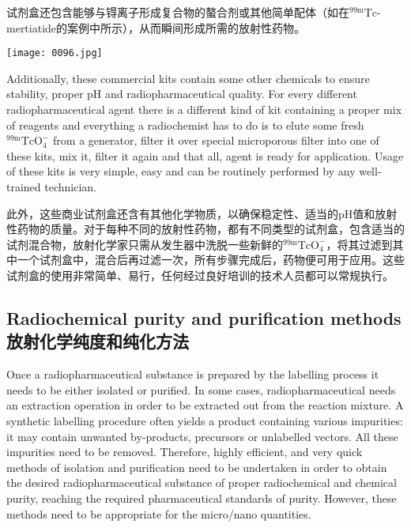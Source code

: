 \documentclass[dvipsnames, svgnames,a4paper,11pt]{article}
\begin{document}
试剂盒还包含能够与锝离子形成复合物的螯合剂或其他简单配体（如在${}^\mathrm{99m}\mathrm{Tc}$-mertiatide的案例中所示），从而瞬间形成所需的放射性药物。

\begin{figure*}[h]
    \centering
    \texttt{[image: 0096.jpg]}
\end{figure*}

Additionally, these commercial kits contain some other chemicals to ensure stability,
proper pH and radiopharmaceutical quality. For every different radiopharmaceutical
agent there is a different kind of kit containing a proper mix of reagents and
everything a radiochemist has to do is to elute some fresh ${}^\mathrm{99m}\mathrm{TcO_4^-}$ from a generator,
filter it over special microporous filter into one of these kits, mix it, filter it again and
that all, agent is ready for application. Usage of these kits is very simple, easy and
can be routinely performed by any well-trained technician.

此外，这些商业试剂盒还含有其他化学物质，以确保稳定性、适当的pH值和放射性药物的质量。对于每种不同的放射性药物，都有不同类型的试剂盒，包含适当的试剂混合物，放射化学家只需从发生器中洗脱一些新鲜的${}^\mathrm{99m}\mathrm{TcO_4^-}$，将其过滤到其中一个试剂盒中，混合后再过滤一次，所有步骤完成后，药物便可用于应用。这些试剂盒的使用非常简单、易行，任何经过良好培训的技术人员都可以常规执行。

\subsection{Radiochemical purity and purification methods \\放射化学纯度和纯化方法}



Once a radiopharmaceutical substance is prepared by the labelling process it needs
to be either isolated or purified. In some cases, radiopharmaceutical needs an
extraction operation in order to be extracted out from the reaction mixture. A
synthetic labelling procedure often yields a product containing various impurities: it
may contain unwanted by-products, precursors or unlabelled vectors. All these
impurities need to be removed. Therefore, highly efficient, and very quick methods of
isolation and purification need to be undertaken in order to obtain the desired
radiopharmaceutical substance of proper radiochemical and chemical purity,
reaching the required pharmaceutical standards of purity. However, these methods
need to be appropriate for the micro/nano quantities.
\end{document}
